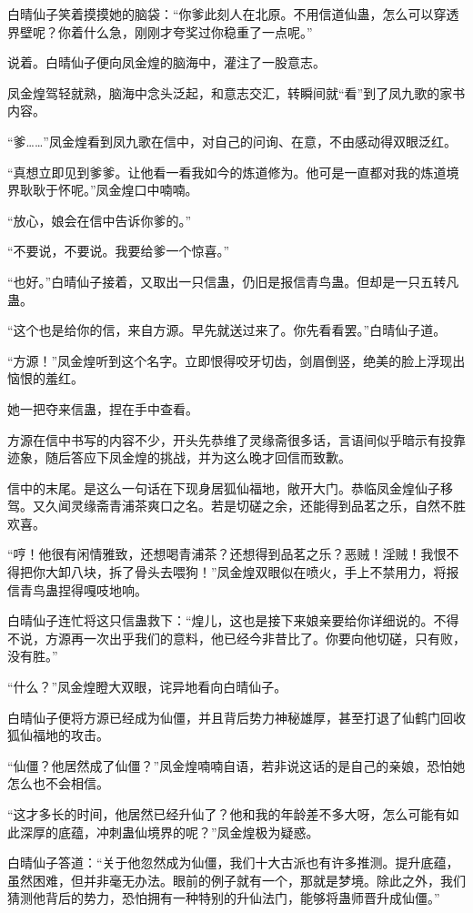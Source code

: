 \begin{this_body}
白晴仙子笑着摸摸她的脑袋：“你爹此刻人在北原。不用信道仙蛊，怎么可以穿透界壁呢？你着什么急，刚刚才夸奖过你稳重了一点呢。”

说着。白晴仙子便向凤金煌的脑海中，灌注了一股意志。

凤金煌驾轻就熟，脑海中念头泛起，和意志交汇，转瞬间就“看”到了凤九歌的家书内容。

“爹……”凤金煌看到凤九歌在信中，对自己的问询、在意，不由感动得双眼泛红。

“真想立即见到爹爹。让他看一看我如今的炼道修为。他可是一直都对我的炼道境界耿耿于怀呢。”凤金煌口中喃喃。

“放心，娘会在信中告诉你爹的。”

“不要说，不要说。我要给爹一个惊喜。”

“也好。”白晴仙子接着，又取出一只信蛊，仍旧是报信青鸟蛊。但却是一只五转凡蛊。

“这个也是给你的信，来自方源。早先就送过来了。你先看看罢。”白晴仙子道。

“方源！”凤金煌听到这个名字。立即恨得咬牙切齿，剑眉倒竖，绝美的脸上浮现出恼恨的羞红。

她一把夺来信蛊，捏在手中查看。

方源在信中书写的内容不少，开头先恭维了灵缘斋很多话，言语间似乎暗示有投靠迹象，随后答应下凤金煌的挑战，并为这么晚才回信而致歉。

信中的末尾。是这么一句话在下现身居狐仙福地，敞开大门。恭临凤金煌仙子移驾。又久闻灵缘斋青浦茶爽口之名。若是切磋之余，还能得到品茗之乐，自然不胜欢喜。

“哼！他很有闲情雅致，还想喝青浦茶？还想得到品茗之乐？恶贼！淫贼！我恨不得把你大卸八块，拆了骨头去喂狗！”凤金煌双眼似在喷火，手上不禁用力，将报信青鸟蛊捏得嘎吱地响。

白晴仙子连忙将这只信蛊救下：“煌儿，这也是接下来娘亲要给你详细说的。不得不说，方源再一次出乎我们的意料，他已经今非昔比了。你要向他切磋，只有败，没有胜。”

“什么？”凤金煌瞪大双眼，诧异地看向白晴仙子。

白晴仙子便将方源已经成为仙僵，并且背后势力神秘雄厚，甚至打退了仙鹤门回收狐仙福地的攻击。

“仙僵？他居然成了仙僵？”凤金煌喃喃自语，若非说这话的是自己的亲娘，恐怕她怎么也不会相信。

“这才多长的时间，他居然已经升仙了？他和我的年龄差不多大呀，怎么可能有如此深厚的底蕴，冲刺蛊仙境界的呢？”凤金煌极为疑惑。

白晴仙子答道：“关于他忽然成为仙僵，我们十大古派也有许多推测。提升底蕴，虽然困难，但并非毫无办法。眼前的例子就有一个，那就是梦境。除此之外，我们猜测他背后的势力，恐怕拥有一种特别的升仙法门，能够将蛊师晋升成仙僵。”


\end{this_body}
